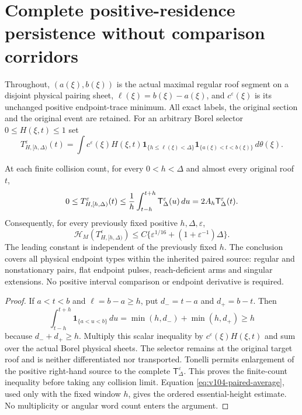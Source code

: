 \section{Complete positive-residence persistence without comparison corridors}
\label{sec:v105-persistence}
Throughout, $(a(\xi),b(\xi))$ is the actual maximal regular roof
segment on a disjoint physical pairing sheet,
$\ell(\xi)=b(\xi)-a(\xi)$, and $c^\varepsilon(\xi)$ is its
unchanged positive endpoint-trace minimum. All exact labels,
the original section and the original event are retained.
For an arbitrary Borel selector $0\le H(\xi,t)\le1$ set
\[
 T_{H,[h,\Delta)}^\varepsilon(t)=
 \int c^\varepsilon(\xi)H(\xi,t)
 \mathbf1_{\{h\le\ell(\xi)<\Delta\}}
 \mathbf1_{\{a(\xi)<t<b(\xi)\}}\,d\theta(\xi).
\]
\begin{theorem}
\label{thm:v105-persistence}
At each finite collision count, for every $0<h<\Delta$ and almost
every original roof $t$,
\begin{equation}\label{eq:v105-persistence}
0\le T_{H,[h,\Delta)}^\varepsilon(t)
\le {1\over h}\int_{t-h}^{t+h}\mathsf T_\Delta^\varepsilon(u)\,du
=2A_h\mathsf T_\Delta^\varepsilon(t).
\end{equation}
Consequently, for every previously fixed positive $h,\Delta,\varepsilon$,
\begin{equation}\label{eq:v105-height}
\mathcal H_M(T_{H,[h,\Delta)}^\varepsilon)
\le C\{\varepsilon^{1/16}+(1+\varepsilon^{-1})\Delta\}.
\end{equation}
The leading constant is independent of the previously fixed $h$.
The conclusion covers all physical endpoint types within the
inherited paired source: regular and nonstationary pairs, flat
endpoint pulses, reach-deficient arms and singular extensions.
No positive interval comparison or endpoint derivative is required.
\end{theorem}
\begin{proof}
If $a<t<b$ and $\ell=b-a\ge h$, put
$d_-=t-a$ and $d_+=b-t$. Then
\[
\int_{t-h}^{t+h}\mathbf1_{\{a<u<b\}}\,du
=\min(h,d_-)+\min(h,d_+)\ge h
\]
because $d_-+d_+\ge h$. Multiply this scalar inequality by
$c^\varepsilon(\xi)H(\xi,t)$ and sum over the actual Borel
physical sheets. The selector remains at the original target roof
and is neither differentiated nor transported. Tonelli permits
enlargement of the positive right-hand source to the complete
$\mathsf T_\Delta^\varepsilon$. This proves the finite-count inequality
before taking any collision limit. Equation
\eqref{eq:v104-paired-average}, used only with the fixed
window $h$, gives the ordered essential-height estimate.
No multiplicity or angular word count enters the argument.
\end{proof}
